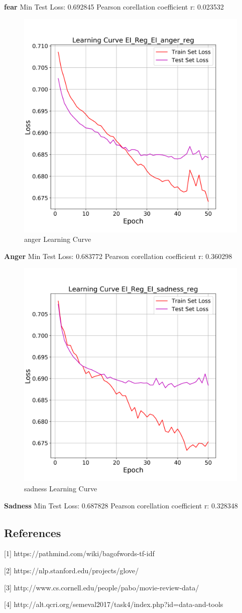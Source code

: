 \documentclass[12pt]{article}
\begin{document}
\textbf{fear}
Min Test Loss: 0.692845
Pearson corellation coefficient r: 0.023532


\begin{figure}[h!]
	\centering
	\includegraphics[width=0.6\linewidth]{./img/EI_Reg/EI_anger_reg_loss}
	\caption{anger Learning Curve}
	\label{fig:sin}
\end{figure}

\textbf{Anger}
Min Test Loss: 0.683772
Pearson corellation coefficient r: 0.360298


\begin{figure}[h!]
	\centering
	\includegraphics[width=0.6\linewidth]{./img/EI_Reg/EI_sadness_reg_loss}
	\caption{sadness Learning Curve}
	\label{fig:sin}
\end{figure}


\textbf{Sadness}
Min Test Loss: 0.687828
Pearson corellation coefficient r: 0.328348






\subsection*{References}
[1] https://pathmind.com/wiki/bagofwords-tf-idf

[2] https://nlp.stanford.edu/projects/glove/

[3] http://www.cs.cornell.edu/people/pabo/movie-review-data/

[4] http://alt.qcri.org/semeval2017/task4/index.php?id=data-and-tools
\end{document}
